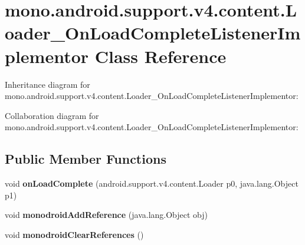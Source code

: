 \hypertarget{classmono_1_1android_1_1support_1_1v4_1_1content_1_1_loader___on_load_complete_listener_implementor}{}\section{mono.\+android.\+support.\+v4.\+content.\+Loader\+\_\+\+On\+Load\+Complete\+Listener\+Implementor Class Reference}
\label{classmono_1_1android_1_1support_1_1v4_1_1content_1_1_loader___on_load_complete_listener_implementor}


Inheritance diagram for mono.\+android.\+support.\+v4.\+content.\+Loader\+\_\+\+On\+Load\+Complete\+Listener\+Implementor\+:


Collaboration diagram for mono.\+android.\+support.\+v4.\+content.\+Loader\+\_\+\+On\+Load\+Complete\+Listener\+Implementor\+:
\subsection*{Public Member Functions}
\begin{DoxyCompactItemize}
\item 
\mbox{\label{classmono_1_1android_1_1support_1_1v4_1_1content_1_1_loader___on_load_complete_listener_implementor_a9b4a8a9e279f40edd649d27a3078c7e0}} 
void {\bfseries on\+Load\+Complete} (android.\+support.\+v4.\+content.\+Loader p0, java.\+lang.\+Object p1)
\item 
\mbox{\label{classmono_1_1android_1_1support_1_1v4_1_1content_1_1_loader___on_load_complete_listener_implementor_a3a4c9ef8ad15330e6de3d2665a8cc66e}} 
void {\bfseries monodroid\+Add\+Reference} (java.\+lang.\+Object obj)
\item 
\mbox{\label{classmono_1_1android_1_1support_1_1v4_1_1content_1_1_loader___on_load_complete_listener_implementor_ada446ac79bc14bf9ee76ba6859226059}} 
void {\bfseries monodroid\+Clear\+References} ()
\end{DoxyCompactItemize}

